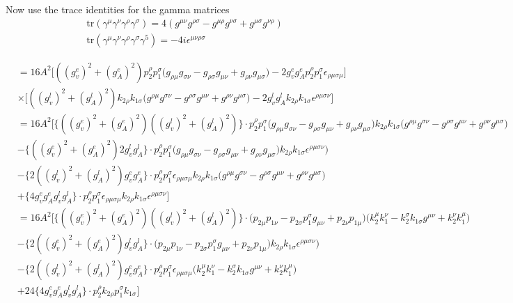 \documentclass[11pt]{article}
\begin{document}
\begin{center}
Now use the trace identities for the gamma matrices
\begin{align*}
&\text{tr} (\gamma^{\mu} \gamma^{\nu} \gamma^{\rho} \gamma^{\sigma}) = 4 (g^{\mu\nu} g^{\rho \sigma} - g^{\mu \rho}g^{\nu \sigma} + g^{\mu \sigma}g^{\nu \rho})\\
& \text{tr} (\gamma^{\mu} \gamma^{\nu} \gamma^{\rho} \gamma^{\sigma} \gamma^5) = -4i \epsilon^{\mu \nu \rho \sigma}
\end{align*}
\end{center}
\begin{align*}
&= 16 A^2 \Big[
 ((g_v^e)^2 + (g_A^e)^2)p_2^{\rho} p_1^{\sigma} \big(
g_{\rho \mu} g_{\sigma \nu} 
- g_{\rho \sigma} g_{\mu \nu}
+ g_{\rho \nu} g_{\mu \sigma}
\big)
- 2 g_v^e g_A^e p_2^{\rho}  p_1^{\sigma} 
\epsilon_{\rho \mu \sigma \mu}
\Big]\\
&\times \Big[
((g_v^l)^2 + (g_A^l)^2) k_{2 \rho} k_{1 \sigma} 
\big(
g^{\rho \mu} g^{\sigma \nu} 
- g^{\rho \sigma} g^{\mu \nu}
+ g^{\rho \nu} g^{\mu \sigma}
\big)
 - 2 g_v^l g_A^l 
k_{2 \rho} k_{1 \sigma} 
\epsilon^{\rho \mu \sigma \nu}
\Big]\\
&= 16 A^2 \Big[
 \{((g_v^e)^2 + (g_A^e)^2)
 ((g_v^l)^2 + (g_A^l)^2)\} \cdot
 p_2^{\rho} p_1^{\sigma} \big(
g_{\rho \mu} g_{\sigma \nu} 
- g_{\rho \sigma} g_{\mu \nu}
+ g_{\rho \nu} g_{\mu \sigma}
\big) k_{2 \rho} k_{1 \sigma} 
\big(
g^{\rho \mu} g^{\sigma \nu} 
- g^{\rho \sigma} g^{\mu \nu}
+ g^{\rho \nu} g^{\mu \sigma}
\big)\\
 &- \{((g_v^e)^2 + (g_A^e)^2)2 g_v^l g_A^l \} \cdot
 p_2^{\rho} p_1^{\sigma} \big(
g_{\rho \mu} g_{\sigma \nu} 
- g_{\rho \sigma} g_{\mu \nu}
+ g_{\rho \nu} g_{\mu \sigma}
\big)
k_{2 \rho} k_{1 \sigma} 
\epsilon^{\rho \mu \sigma \nu}
)\\
&- \{2 ((g_v^l)^2 + (g_A^l)^2) g_v^e g_A^e \} \cdot
p_2^{\rho}  p_1^{\sigma} 
\epsilon_{\rho \mu \sigma \mu}
 k_{2 \rho} k_{1 \sigma} 
\big(
g^{\rho \mu} g^{\sigma \nu} 
- g^{\rho \sigma} g^{\mu \nu}
+ g^{\rho \nu} g^{\mu \sigma}
\big)\\
& +\{4  g_v^e g_A^e g_v^l g_A^l  \} \cdot
p_2^{\rho}  p_1^{\sigma} 
\epsilon_{\rho \mu \sigma \mu} 
k_{2 \rho} k_{1 \sigma} 
\epsilon^{\rho \mu \sigma \nu}
\Big]\\
&= 16 A^2 \Big[
 \{((g_v^e)^2 + (g_A^e)^2)  ((g_v^l)^2 + (g_A^l)^2)\} \cdot
\big( p_{2 \mu} p_{1 \nu} 
- p_{2 \sigma} p_1^{ \sigma} g_{\mu \nu}
+ p_{2 \nu} p_{1 \mu} \Big)\Big( k_2^{\mu} k_1^{\nu}
- k_2^{\sigma} k_{1 \sigma} g^{\mu \nu}
+ k_2^{\nu} k_1^{\mu}\Big)\\
 &-
  \{2 ((g_v^e)^2 + (g_A^e)^2) g_v^l g_A^l \} \cdot
 \big(
 p_{2\mu} p_{1 \nu} - p_{2\sigma} p_1^{ \sigma} g_{\mu\nu}
+ p_{2\nu} p_{1 \mu} \big)
k_{2 \rho} k_{1 \sigma} \epsilon^{\rho \mu \sigma \nu})\\
&- 
\{2 ((g_v^l)^2 + (g_A^l)^2) g_v^e g_A^e \} \cdot
p_2^{\rho}  p_1^{\sigma} \epsilon_{\rho \mu \sigma \mu}
\big( k_2^{ \mu} k_1^{ \nu}  - k_2^{ \sigma} k_{1 \sigma} g^{\mu \nu} + k_2^{ \nu} k_1^{ \mu}\big)\\
& +
24 \{4  g_v^e g_A^e g_v^l g_A^l  \} \cdot
p_2^{\rho}  k_{2 \rho} p_1^{\sigma} k_{1 \sigma} 
\Big]\\
\end{align*}
\end{document}
